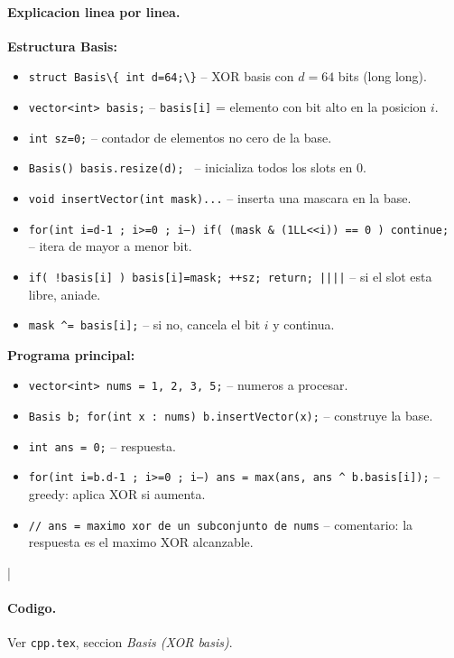 \paragraph{Explicacion linea por linea.}
\textbf{Estructura Basis:}
\begin{itemize}\setlength\itemsep{0pt}
	\item \verb|struct Basis\{ int d=64;\}| -- XOR basis con $d = 64$ bits (long long).
	\item \texttt{vector<int> basis;} -- \texttt{basis[i]} = elemento con bit alto en la posicion $i$.
	\item \texttt{int sz=0;} -- contador de elementos no cero de la base.
	\item \texttt{Basis(){ basis.resize(d); }} -- inicializa todos los slots en 0.
	\item \texttt{void insertVector(int mask){...}} -- inserta una mascara en la base.
	\item \texttt{for(int i=d-1 ; i>=0 ; i--){ if( (mask \& (1LL<<i)) == 0 ) continue; }} -- itera de mayor a menor bit.
	\item \texttt{if( !basis[i] ){ basis[i]=mask; ++sz; return; }||||} -- si el slot esta libre, aniade.
	\item \texttt{mask \^{}= basis[i];} -- si no, cancela el bit $i$ y continua.
\end{itemize}
\textbf{Programa principal:}
\begin{itemize}\setlength\itemsep{0pt}
	\item \texttt{vector<int> nums = {1, 2, 3, 5};} -- numeros a procesar.
	\item \texttt{Basis b; for(int x : nums) b.insertVector(x);} -- construye la base.
	\item \texttt{int ans = 0;} -- respuesta.
	\item \texttt{for(int i=b.d-1 ; i>=0 ; i--) ans = max(ans, ans \^{} b.basis[i]);} -- greedy: aplica XOR si aumenta.
	\item \texttt{// ans = maximo xor de un subconjunto de nums} -- comentario: la respuesta es el maximo XOR alcanzable.
\end{itemize}
|\paragraph{Codigo.}
Ver \texttt{cpp.tex}, seccion \textit{Basis (XOR basis)}.

\vspace{0.5em}
